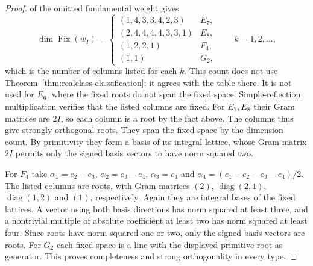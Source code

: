 \documentclass[12pt]{amsart}
\numberwithin{equation}{section}
\theoremstyle{plain}
\theoremstyle{definition}
\theoremstyle{remark}
\begin{document}
\begin{proof}
of the omitted fundamental weight gives
\[
 \dim\operatorname{Fix}(w_I)=
 \begin{cases}
 (1,4,3,3,4,2,3)&E_7,\\
 (2,4,4,4,4,3,3,1)&E_8,\\
 (1,2,2,1)&F_4,\\
 (1,1)&G_2,
 \end{cases}
 \qquad k=1,2,\ldots,
\]
which is the number of columns listed for each $k$. This count does not
use Theorem~\ref{thm:realclass-classification}; it agrees with the
table there. It is not used for $E_6$, where the fixed roots do not
span the fixed space. Simple-reflection
multiplication verifies that the listed columns are fixed.
For $E_7,E_8$ their Gram matrices are $2I$, so each column is a root
by the fact above. The columns thus give strongly orthogonal roots.
They span the fixed space by the dimension count. By primitivity they
form a basis of its integral lattice, whose Gram matrix $2I$ permits
only the signed basis vectors to have norm squared two.

For $F_4$ take $\alpha_1=e_2-e_3$, $\alpha_2=e_3-e_4$, $\alpha_3=e_4$
and $\alpha_4=(e_1-e_2-e_3-e_4)/2$. The listed columns are roots,
with Gram matrices $(2)$, $\operatorname{diag}(2,1)$,
$\operatorname{diag}(1,2)$ and $(1)$, respectively. Again they are
integral bases of the fixed lattices. A vector using both basis
directions has norm squared at least three, and a nontrivial multiple
of absolute coefficient at least two has norm squared at least four.
Since roots have norm squared one or two, only the signed basis vectors
are roots. For $G_2$ each fixed space is a line with the displayed
primitive root as generator. This proves completeness and strong
orthogonality in every type.
\end{proof}



\end{document}

